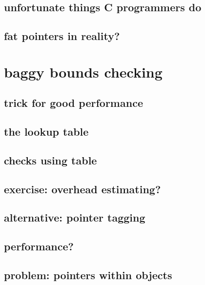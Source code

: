 \subsection{unfortunate things C programmers do}


\subsection{fat pointers in reality?}


\section{baggy bounds checking}


\subsection{trick for good performance}


\subsection{the lookup table}


\subsection{checks using table}


\subsection{exercise: overhead estimating?}


\subsection{alternative: pointer tagging}


\subsection{performance?}


\subsection{problem: pointers within objects}


